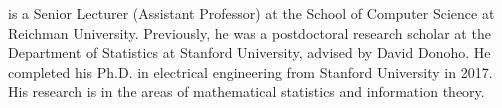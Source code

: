 is a Senior Lecturer (Assistant Professor) at the School of Computer Science at Reichman University. Previously, he was a postdoctoral research scholar at the Department of Statistics at Stanford University, advised by David Donoho. He completed his Ph.D. in electrical engineering from Stanford University in 2017. His research is in the areas of mathematical statistics and information theory. 